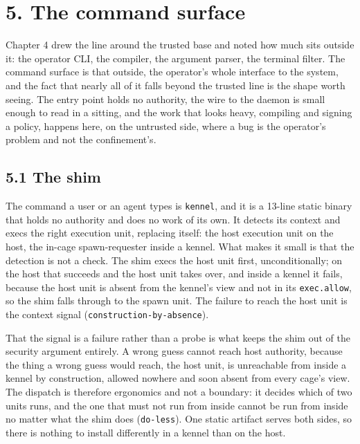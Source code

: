 \hypertarget{the-command-surface}{%
\chapter{5. The command surface}\label{the-command-surface}}

Chapter 4 drew the line around the trusted base and noted how much sits
outside it: the operator CLI, the compiler, the argument parser, the
terminal filter. The command surface is that outside, the operator's
whole interface to the system, and the fact that nearly all of it falls
beyond the trusted line is the shape worth seeing. The entry point holds
no authority, the wire to the daemon is small enough to read in a
sitting, and the work that looks heavy, compiling and signing a policy,
happens here, on the untrusted side, where a bug is the operator's
problem and not the confinement's.

\hypertarget{the-shim}{%
\section{5.1 The shim}\label{the-shim}}

The command a user or an agent types is \texttt{kennel}, and it is a
13-line static binary that holds no authority and does no work of its
own. It detects its context and execs the right execution unit,
replacing itself: the host execution unit on the host, the in-cage
spawn-requester inside a kennel. What makes it small is that the
detection is not a check. The shim execs the host unit first,
unconditionally; on the host that succeeds and the host unit takes over,
and inside a kennel it fails, because the host unit is absent from the
kennel's view and not in its \texttt{exec.allow}, so the shim falls
through to the spawn unit. The failure to reach the host unit is the
context signal (\texttt{construction-by-absence}).

That the signal is a failure rather than a probe is what keeps the shim
out of the security argument entirely. A wrong guess cannot reach host
authority, because the thing a wrong guess would reach, the host unit,
is unreachable from inside a kennel by construction, allowed nowhere and
soon absent from every cage's view. The dispatch is therefore ergonomics
and not a boundary: it decides which of two units runs, and the one that
must not run from inside cannot be run from inside no matter what the
shim does (\texttt{do-less}). One static artifact serves both sides, so
there is nothing to install differently in a kennel than on the host.

